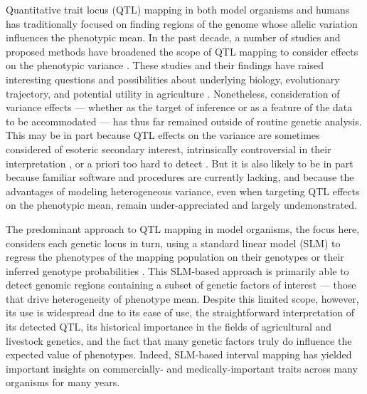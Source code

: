 Quantitative trait locus (QTL) mapping in both model organisms and humans has traditionally focused on finding regions of the genome whose allelic variation influences the phenotypic mean.
In the past decade, a number of studies and proposed methods have broadened the scope of QTL mapping to consider effects on the phenotypic variance \citep{Pare2010,Ronnegard2011a,Hulse2013}. 
These studies and their findings have raised interesting questions and possibilities about underlying biology, evolutionary trajectory, and potential utility in agriculture \citep{Wagner1997,Dworkin2005,Mulder2015}.
Nonetheless, consideration of variance effects --- whether as the target of inference or as a feature of the data to be accommodated ---
has thus far remained outside of routine genetic analysis.
This may be in part because QTL effects on the variance are sometimes considered of esoteric secondary interest, intrinsically controversial in their interpretation \citep{Sun2013a,Shen2013}, or a priori too hard to detect \citep{Visscher2010a}.
But it is also likely to be in part because familiar software and procedures are currently lacking, and because the advantages of modeling heterogeneous variance, even when targeting QTL effects on the phenotypic mean, remain under-appreciated and largely undemonstrated.

The predominant approach to QTL mapping in model organisms, the focus here, considers each genetic locus in turn, using a standard linear model (SLM) to regress the phenotypes of the mapping population on their genotypes or their inferred genotype probabilities \citep{Lander1989a,Haley1992}.
This SLM-based approach is primarily able to detect genomic regions containing a subset of genetic factors of interest --- those that drive heterogeneity of phenotype mean.
Despite this limited scope, however, its use is widespread due to its ease of use, the straightforward interpretation of its detected QTL, its historical importance in the fields of agricultural and livestock genetics, and the fact that many genetic factors truly do influence the expected value of phenotypes.
Indeed, SLM-based interval mapping has yielded important insights on commercially- and medically-important traits across many organisms for many years.

